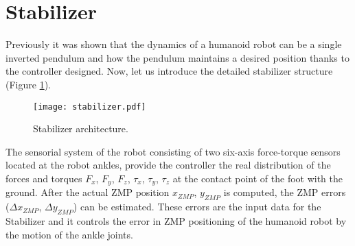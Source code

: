 \section{Stabilizer}
Previously it was shown that the dynamics of a humanoid robot can be a single inverted pendulum and how the pendulum maintains a desired position thanks to the controller designed. Now, let us introduce the detailed stabilizer structure (Figure \ref{fig:stabilizer}).

\begin{figure}[!h]
\centering
\texttt{[image: stabilizer.pdf]}
\caption{Stabilizer architecture.}
\label{fig:stabilizer}
\end{figure}

The sensorial system of the robot consisting of two six-axis force-torque sensors located at the robot ankles, provide the controller the real distribution of the forces and torques $F_x$, $F_y$, $F_z$, $\tau_x$, $\tau_y$, $\tau_z$ at the contact point of the foot with the ground. After the actual ZMP position $x_{ZMP}$, $y_{ZMP}$ is computed, the ZMP errors ($\Delta x_{ZMP}$, $\Delta y_{ZMP}$) can be estimated. These errors are the input data for the Stabilizer and it controls the error in ZMP positioning of the humanoid robot by the motion of the ankle joints.

